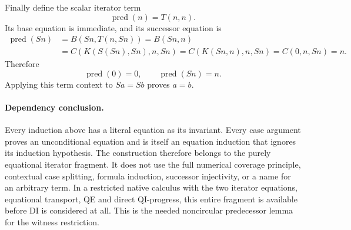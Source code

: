 Finally define the scalar iterator term
\[
 \operatorname{pred}(n)=T(n,n).
\]
Its base equation is immediate, and its successor equation is
\begin{align*}
 \operatorname{pred}(Sn)
 &=B(Sn,T(n,Sn))=B(Sn,n)\\
 &=C(K(S(Sn),Sn),n,Sn)
  =C(K(Sn,n),n,Sn)=C(0,n,Sn)=n.
\end{align*}
Therefore
\[
 \boxed{\operatorname{pred}(0)=0,\qquad
        \operatorname{pred}(Sn)=n.}
\]
Applying this term context to $Sa=Sb$ proves $a=b$.

\paragraph{Dependency conclusion.}
Every induction above has a literal equation as its invariant. Every case
argument proves an unconditional equation and is itself an equation induction
that ignores its induction hypothesis. The construction therefore belongs to
the purely equational iterator fragment. It does not use the full numerical
coverage principle, contextual case splitting, formula induction, successor
injectivity, or a name for an arbitrary term. In a restricted native calculus
with the two iterator equations, equational transport, QE and direct
QI-progress, this entire fragment is available before DI is considered at all.
This is the needed noncircular predecessor lemma for the witness restriction.
